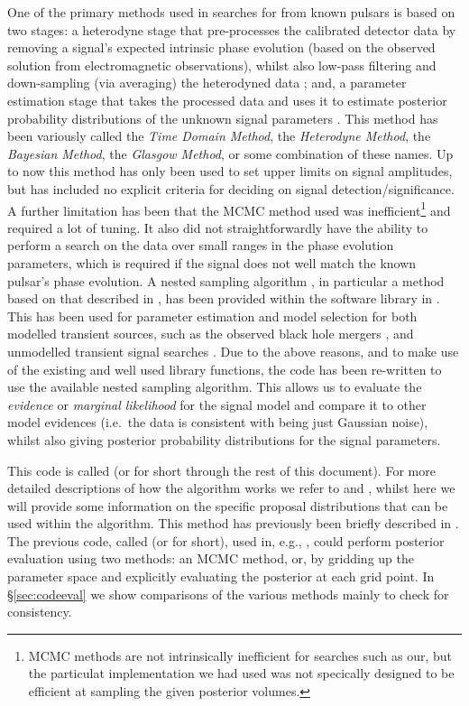 One of the primary methods used in searches for \gws from known pulsars is based on two stages: a heterodyne
stage that pre-processes the calibrated \gw detector data by removing a signal's expected intrinsic phase
evolution (based on the observed solution from electromagnetic observations), whilst also low-pass filtering and
down-sampling (via averaging) the heterodyned data \citep{2005PhRvD..72j2002D}; and, a parameter estimation stage that takes the
processed data and uses it to estimate posterior probability distributions of the unknown signal parameters
\citep[e.g., using a Markov chain Monte Carlo (MCMC)][]{2010ApJ...713..671A}. This method has been variously
called the {\it Time Domain Method}, the {\it Heterodyne Method}, the {\it Bayesian Method}, the {\it Glasgow
Method}, or some combination of these names. Up to now this method has only been used to set upper limits
on signal amplitudes, but has included no explicit criteria for deciding on signal detection/significance. A further
limitation has been that the MCMC method used was inefficient\footnote{MCMC methods are not intrinsically inefficient for
searches such as our, but the particulat implementation we had used was not specically designed to be efficient at sampling the
given posterior volumes.} and required a lot of tuning. It also
did not straightforwardly have the ability to perform a search on the data over small ranges in the phase
evolution parameters, which is required if the \gw signal does not well match the known pulsar's phase evolution. A nested sampling
algorithm \citep{Skilling:2006}, in particular a method based on that described in \citet{Veitch:2010}, has been provided within
the \lalinf software library \citep{2015PhRvD..91d2003V} in \citet{lalsuite}. This has been used for parameter estimation and model
selection for both modelled transient sources, such as the observed black hole mergers \citep{2016PhRvL.116x1102A}, and unmodelled transient signal
searches \citep{2015arXiv151105955L}. Due to the above reasons, and to make use of the existing and well used library functions, the code has been
re-written to use the available nested sampling algorithm. This allows us to evaluate the {\it evidence} or {\it
marginal likelihood} for the signal model and compare it to other model evidences (i.e.\ the data is consistent with being just
Gaussian noise), whilst also giving posterior probability distributions for the signal parameters.

This code is called \lppenf (or \lppen for short through the rest of this document). For more detailed descriptions of how the algorithm works we refer
to \citet{Veitch:2010} and \citep{2015PhRvD..91d2003V}, whilst here we will provide some information on the specific proposal
distributions that can be used within the algorithm. This method has previously been briefly described in \citet{2012JPhCS.363a2041P}.
The previous code, called \lppef (or \lppe for short), used in, e.g., \citet{2010ApJ...713..671A}, could perform posterior evaluation
using two methods: an MCMC method, or, by gridding up the parameter space and explicitly evaluating the posterior at each
grid point. In \S\ref{sec:codeeval} we show comparisons of the various methods mainly to check \lppen for consistency.


